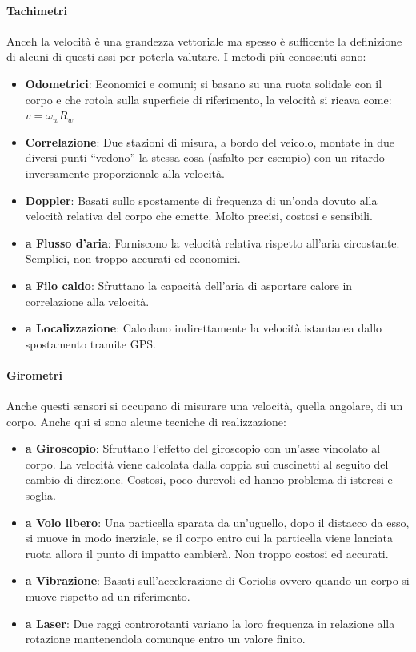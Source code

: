 \documentclass[12pt]{article}
\begin{document}
\paragraph{Tachimetri} Anceh la velocità è una grandezza vettoriale ma spesso è sufficente la definizione di alcuni di questi assi per poterla valutare. I metodi più conosciuti sono:
\begin{itemize}
  \item \textbf{Odometrici}: Economici e comuni; si basano su una ruota solidale con il corpo e che rotola sulla superficie di riferimento, la velocità si ricava come: $v=\omega_{w} R_{w}$
  \item \textbf{Correlazione}: Due stazioni di misura, a bordo del veicolo, montate in due diversi punti ``vedono'' la stessa cosa (asfalto per esempio) con un ritardo inversamente proporzionale alla velocità.
  \item \textbf{Doppler}: Basati sullo spostamente di frequenza di un'onda dovuto alla velocità relativa del corpo che emette. Molto precisi, costosi e sensibili.
  \item \textbf{a Flusso d'aria}: Forniscono la velocità relativa rispetto all'aria circostante. Semplici, non troppo accurati ed economici.
  \item \textbf{a Filo caldo}: Sfruttano la capacità dell'aria di asportare calore in correlazione alla velocità.
  \item \textbf{a Localizzazione}: Calcolano indirettamente la velocità istantanea dallo spostamento tramite GPS.
\end{itemize}

\paragraph{Girometri} Anche questi sensori si occupano di misurare una velocità, quella angolare, di un corpo. Anche qui si sono alcune tecniche di realizzazione:
\begin{itemize}
  \item \textbf{a Giroscopio}: Sfruttano l'effetto del giroscopio con un'asse vincolato al corpo. La velocità viene calcolata dalla coppia sui cuscinetti al seguito del cambio di direzione. Costosi, poco durevoli ed hanno problema di isteresi e soglia.
  \item \textbf{a Volo libero}: Una particella sparata da un'uguello, dopo il distacco da esso, si muove in modo inerziale, se il corpo entro cui la particella viene lanciata ruota allora il punto di impatto cambierà. Non troppo costosi ed accurati.
  \item \textbf{a Vibrazione}: Basati sull'accelerazione di Coriolis ovvero quando un corpo si muove rispetto ad un riferimento.
  \item \textbf{a Laser}: Due raggi controrotanti variano la loro frequenza in relazione alla rotazione mantenendola comunque entro un valore finito.
\end{itemize}
\end{document}
